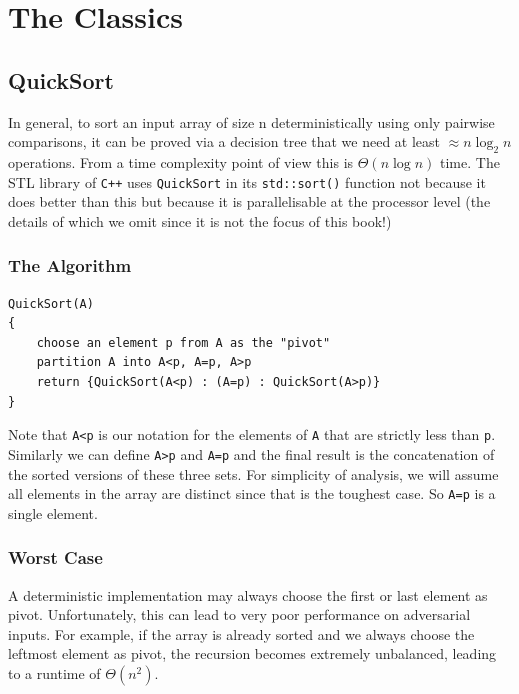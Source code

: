 \chapter{The Classics}
\section{QuickSort}

In general, to sort an input array of size n deterministically using only pairwise comparisons,
it can be proved via a decision tree that we need at least $\approx n\log_2 n$ operations. From a 
time complexity point of view this is $\Theta(n\log n)$ time. The STL library of \texttt{C++} uses 
\texttt{QuickSort} in its \texttt{std::sort()} function not because it does better than this 
but because it is parallelisable at the processor level (the details of which we omit since it is not 
the focus of this book!)\\

\subsection{The Algorithm}
\begin{center}
\begin{minipage}{0.9\linewidth}
\begin{framed}
\begin{Verbatim}
QuickSort(A)
{
    choose an element p from A as the "pivot"
    partition A into A<p, A=p, A>p
    return {QuickSort(A<p) : (A=p) : QuickSort(A>p)}
}
\end{Verbatim}
\vspace{-4mm}
\end{framed}
\end{minipage}
\end{center}

\noindent Note that \texttt{A<p} is our notation for the elements of \texttt{A} that are strictly less than \texttt{p}.
Similarly we can define \texttt{A>p} and \texttt{A=p} and the final result is the concatenation of the sorted 
versions of these three sets. 
For simplicity of analysis, we will assume all elements in the array are distinct since that 
is the toughest case. So \texttt{A=p} is a single element.\\


\subsection{Worst Case}
\noindent A deterministic implementation may always choose the first or last element as pivot. 
Unfortunately, this can lead to very poor performance on adversarial inputs. 
For example, if the array is already sorted and we always choose the leftmost element as 
pivot, the recursion becomes extremely unbalanced, leading to a runtime of $\Theta(n^2)$.

